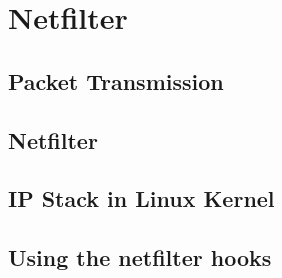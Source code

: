 \section{Netfilter}

\subsection{Packet Transmission}

\subsection{Netfilter}

\subsection{IP Stack in Linux Kernel}

\subsection{Using the netfilter hooks}


